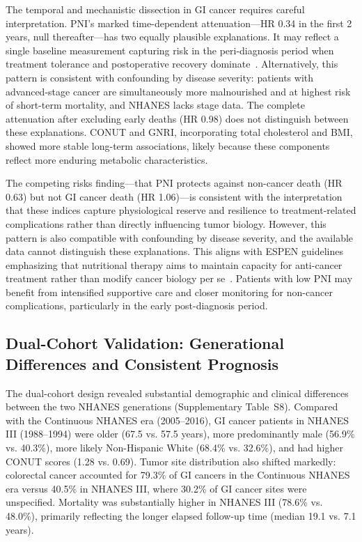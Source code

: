 \documentclass[review]{elsarticle}
\begin{document}
The temporal and mechanistic dissection in GI cancer requires careful interpretation. PNI's marked time-dependent attenuation---HR 0.34 in the first 2 years, null thereafter---has two equally plausible explanations. It may reflect a single baseline measurement capturing risk in the peri-diagnosis period when treatment tolerance and postoperative recovery dominate~\cite{lee2017}. Alternatively, this pattern is consistent with confounding by disease severity: patients with advanced-stage cancer are simultaneously more malnourished and at highest risk of short-term mortality, and NHANES lacks stage data. The complete attenuation after excluding early deaths (HR 0.98) does not distinguish between these explanations. CONUT and GNRI, incorporating total cholesterol and BMI, showed more stable long-term associations, likely because these components reflect more enduring metabolic characteristics.

The competing risks finding---that PNI protects against non-cancer death (HR 0.63) but not GI cancer death (HR 1.06)---is consistent with the interpretation that these indices capture physiological reserve and resilience to treatment-related complications rather than directly influencing tumor biology. However, this pattern is also compatible with confounding by disease severity, and the available data cannot distinguish these explanations. This aligns with ESPEN guidelines emphasizing that nutritional therapy aims to maintain capacity for anti-cancer treatment rather than modify cancer biology per se~\cite{muscaritoli2021,arends2017}. Patients with low PNI may benefit from intensified supportive care and closer monitoring for non-cancer complications, particularly in the early post-diagnosis period.

\subsection{Dual-Cohort Validation: Generational Differences and Consistent Prognosis}

The dual-cohort design revealed substantial demographic and clinical differences between the two NHANES generations (Supplementary Table~S8). Compared with the Continuous NHANES era (2005--2016), GI cancer patients in NHANES III (1988--1994) were older (67.5 vs. 57.5 years), more predominantly male (56.9\% vs. 40.3\%), more likely Non-Hispanic White (68.4\% vs. 32.6\%), and had higher CONUT scores (1.28 vs. 0.69). Tumor site distribution also shifted markedly: colorectal cancer accounted for 79.3\% of GI cancers in the Continuous NHANES era versus 40.5\% in NHANES III, where 30.2\% of GI cancer sites were unspecified. Mortality was substantially higher in NHANES III (78.6\% vs. 48.0\%), primarily reflecting the longer elapsed follow-up time (median 19.1 vs. 7.1 years).
\end{document}
